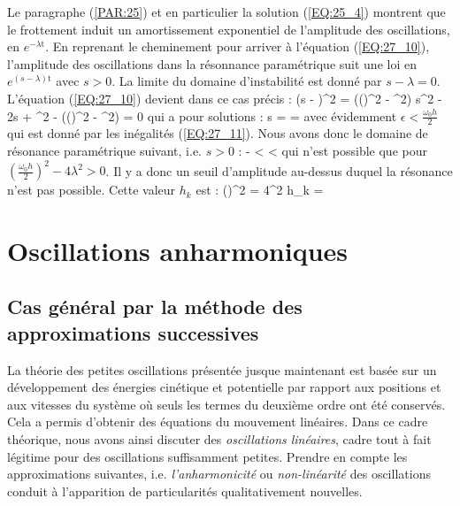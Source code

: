 Le paragraphe (\ref{PAR:25}) et en particulier la solution (\ref{EQ:25_4}) montrent que le frottement induit un amortissement exponentiel de l'amplitude des oscillations, en $e^{-\lambda\mathrm{t}}$. En reprenant le cheminement pour arriver à l'\'{e}quation (\ref{EQ:27_10}), l'amplitude des oscillations dans la r\'{e}sonnance param\'{e}trique suit une loi en $e^{(s-\lambda)\mathrm{t}}$ avec $s > 0$. La limite du domaine d'instabilit\'{e} est donn\'{e} par $s - \lambda = 0$. L'\'{e}quation (\ref{EQ:27_10}) devient dans ce cas pr\'{e}cis :
\benn
	(s - \lambda)^{2} = \left(\left(\right)^{2} - \epsilon^{2}\right) \Leftrightarrow s^{2} - 2\lambda s + \lambda^{2} - \left(\left(\right)^{2} - \epsilon^{2}\right) = 0
\eenn
qui a pour solutions :
\benn
	s =  = \lambda \pm {}
\eenn
avec \'{e}videmment $\epsilon < \frac{\omega_{0}h}{2}$ qui est donn\'{e} par les in\'{e}galit\'{e}s (\ref{EQ:27_11}). Nous avons donc le domaine de r\'{e}sonance param\'{e}trique suivant, i.e. $s > 0$ :
\be
	- < \epsilon <  \label{EQ:27_12}
\ee
qui n'est possible que pour $\left(\frac{\omega_{0}h}{2}\right)^{2} - 4\lambda^{2} > 0$. Il y a donc un seuil d'amplitude au-dessus duquel la r\'{e}sonance n'est pas possible. Cette valeur $h_{k}$ est :
\benn
	\left(\right)^{2} = 4\lambda^{2} \Leftrightarrow h_{k} = 
\eenn

\section {Oscillations anharmoniques}\label{PAR:28}

\subsection{Cas g\'{e}n\'{e}ral par la m\'{e}thode des approximations successives}

La th\'{e}orie des petites oscillations pr\'{e}sent\'{e}e jusque maintenant est bas\'{e}e sur un d\'{e}veloppement des \'{e}nergies cin\'{e}tique et potentielle par rapport aux positions et aux vitesses du syst\`{e}me o\`{u} seuls les termes du deuxi\`{e}me ordre ont \'{e}t\'{e} conserv\'{e}s. Cela a permis d'obtenir des \'{e}quations du mouvement lin\'{e}aires. Dans ce cadre th\'{e}orique, nous avons ainsi discuter des \emph{oscillations lin\'{e}aires}, cadre tout \`{a} fait l\'{e}gitime pour des oscillations suffisamment petites. Prendre en compte les approximations suivantes, i.e. \emph{l'anharmonicit\'{e}} ou \emph{non-lin\'{e}arit\'{e}} des oscillations conduit \`{a} l'apparition de particularit\'{e}s qualitativement nouvelles.

